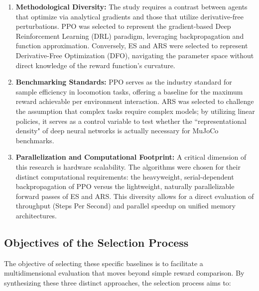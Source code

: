 \begin{enumerate}
    \item \textbf{Methodological Diversity:} The study requires a contrast between agents that optimize via analytical gradients and those that utilize derivative-free perturbations. PPO was selected to represent the gradient-based Deep Reinforcement Learning (DRL) paradigm, leveraging backpropagation and function approximation. Conversely, ES and ARS were selected to represent Derivative-Free Optimization (DFO), navigating the parameter space without direct knowledge of the reward function's curvature.
    
    \item \textbf{Benchmarking Standards:} PPO serves as the industry standard for sample efficiency in locomotion tasks, offering a baseline for the maximum reward achievable per environment interaction. ARS was selected to challenge the assumption that complex tasks require complex models; by utilizing linear policies, it serves as a control variable to test whether the ``representational density" of deep neural networks is actually necessary for MuJoCo benchmarks.
    
    \item \textbf{Parallelization and Computational Footprint:} A critical dimension of this research is hardware scalability. The algorithms were chosen for their distinct computational requirements: the heavyweight, serial-dependent backpropagation of PPO versus the lightweight, naturally parallelizable forward passes of ES and ARS. This diversity allows for a direct evaluation of throughput (Steps Per Second) and parallel speedup on unified memory architectures.
\end{enumerate}

\subsection{Objectives of the Selection Process}
The objective of selecting these specific baselines is to facilitate a multidimensional evaluation that moves beyond simple reward comparison. By synthesizing these three distinct approaches, the selection process aims to:

